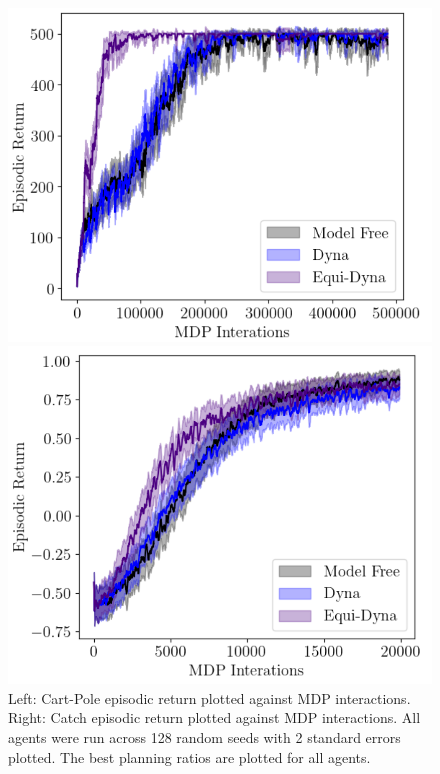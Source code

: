 \documentclass[mlabstract]{jmlr}
\begin{document}
\begin{figure}
	\centering
	\begin{minipage}[b]{.5\textwidth}
		\centering
		\includegraphics[width=\textwidth]{Figures/best_cp.png}
	\end{minipage}%
	\begin{minipage}[b]{.5\textwidth}
		\centering
		\includegraphics[width=\textwidth]{Figures/best_ctch.png}
	\end{minipage}%
	\caption{Left: Cart-Pole episodic return plotted against MDP interactions. Right: Catch episodic return plotted against MDP interactions. All agents were run across 128 random seeds with 2 standard errors plotted. The best planning ratios are plotted for all agents.}
	\label{fig:joint}
\end{figure}
\end{document}
